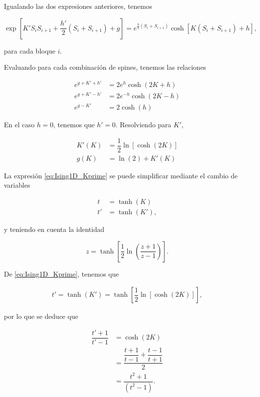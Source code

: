 \documentclass[10pt]{article}
\begin{document}
Igualando las dos expresiones anteriores, tenemos

\begin{equation}
 \exp\left[  K' S_i S_{i+1} + \dfrac{h'}{2} (S_i + S_{i+1}) + g \right] = e^{\frac{h}{2} (S_i + S_{i+1}) }  \cosh\left[ K (S_i + S_{i+1}) + h \right],
\end{equation}

para cada bloque $i$.

Evaluando para cada combinaci\'on de spines, tenemos las relaciones

\begin{align}
e^{g+K'+h'} &= 2e^{h}\cosh(2K+h) \label{eq:Ising1D_Rec1}\\
e^{g+K'-h'} &= 2e^{-h}\cosh(2K-h) \label{eq:Ising1D_Rec2} \\
e^{g-K'} &= 2\cosh(h)  \label{eq:Ising1D_Rec3}
\end{align}

En el caso $h=0$, tenemos que $h'=0$. Resolviendo para $K'$,

\begin{align}
K'(K) &= \dfrac{1}{2} \ln \left[ \cosh(2K) \right] \label{eq:Ising1D_Kprime}\\
g(K) &= \ln(2) + K'(K)
\end{align}

La expresi\'on \ref{eq:Ising1D_Kprime} se puede simplificar mediante el cambio de variables

\begin{align}
t  &= \tanh(K)\\
t' &= \tanh(K'),
\end{align}

y teniendo en cuenta la identidad 

\begin{equation}
z = \tanh\left[\dfrac{1}{2}\ln\left( \dfrac{z+1}{z-1} \right)\right].
\end{equation}

De \ref{eq:Ising1D_Kprime}, tenemos que

\begin{align}
 t' = \tanh(K') = \tanh \left[ \dfrac{1}{2} \ln \left[ \cosh(2K) \right]  \right],
\end{align}

por lo que se deduce que 

\begin{align}
 \dfrac{t'+1}{t'-1}  &= \cosh(2K) \nonumber \\
 &= \dfrac{\dfrac{t+1}{t-1} + \dfrac{t-1}{t+1}}{2} \nonumber \\
 &= \dfrac{t^2+1}{(t^2-1)}.
\end{align}
\end{document}
